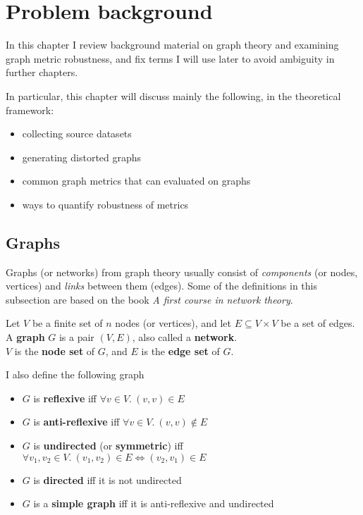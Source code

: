 \section{Problem background}

In this chapter I review background material on graph theory and examining graph metric robustness, and fix terms I will use later to avoid ambiguity in further chapters.

In particular, this chapter will discuss mainly the following, in the theoretical framework:
\begin{itemize}
    \item collecting source datasets
    \item generating distorted graphs
    \item common graph metrics that can evaluated on graphs
    \item ways to quantify robustness of metrics
\end{itemize}

\subsection{Graphs}

Graphs (or networks) from graph theory usually consist of \textit{components} (or nodes, vertices) and \textit{links} between them (edges).
Some of the definitions in this subsection are based on the book \textsl{A first course in network theory}\cite{Estrada2017}.

\begin{definition}[Graph]
    Let $V$ be a finite set of $n$ nodes (or vertices), and let $E \subseteq V \times V$ be a set of edges.\\
    A \textbf{graph} $G$ is a pair $(V, E)$, also called a \textbf{network}.\\
    $V$ is the \textbf{node set} of $G$, and $E$ is the \textbf{edge set} of $G$.
\end{definition}

\noindent
I also define the following graph

\begin{definition}
    \begin{itemize}[leftmargin=*]
        \item $G$ is \textbf{reflexive} iff $\forall v \in V.\ (v, v) \in E$
        \item $G$ is \textbf{anti-reflexive} iff $\forall v \in V.\ (v, v) \notin E$
        \item $G$ is \textbf{undirected} (or \textbf{symmetric}) iff $\forall v_1, v_2 \in V.\ (v_1, v_2) \in E \Leftrightarrow (v_2, v_1) \in E$
        \item $G$ is \textbf{directed} iff it is not undirected
        \item $G$ is a \textbf{simple graph} iff it is anti-reflexive and undirected
    \end{itemize}
\end{definition}

